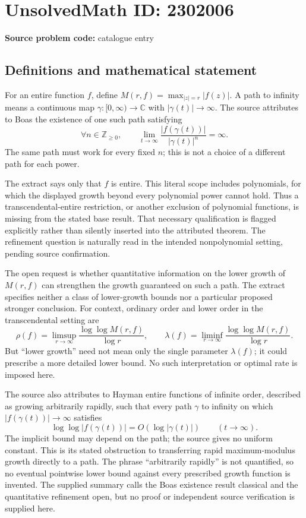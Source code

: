 \documentclass[11pt]{article}
\newcommand{\Z}{\mathbb{Z}}
\newcommand{\C}{\mathbb{C}}
\begin{document}
\section*{UnsolvedMath ID: 2302006}
\textbf{Source problem code:} catalogue entry
\subsection{Definitions and mathematical statement}
For an entire function $f$, define $M(r,f)=\max_{|z|=r}|f(z)|$. A path to infinity means a continuous map $\gamma:[0,\infty)\to\C$ with $|\gamma(t)|\to\infty$. The source attributes to Boas the existence of one such path satisfying
\[
\forall n\in\Z_{\ge0},\qquad
\lim_{t\to\infty}\frac{|f(\gamma(t))|}{|\gamma(t)|^n}=\infty.
\]
The same path must work for every fixed $n$; this is not a choice of a different path for each power.

The extract says only that $f$ is entire. This literal scope includes polynomials, for which the displayed growth beyond every polynomial power cannot hold. Thus a transcendental-entire restriction, or another exclusion of polynomial functions, is missing from the stated base result. That necessary qualification is flagged explicitly rather than silently inserted into the attributed theorem. The refinement question is naturally read in the intended nonpolynomial setting, pending source confirmation.

The open request is whether quantitative information on the lower growth of $M(r,f)$ can strengthen the growth guaranteed on such a path. The extract specifies neither a class of lower-growth bounds nor a particular proposed stronger conclusion. For context, ordinary order and lower order in the transcendental setting are
\[
\rho(f)=\limsup_{r\to\infty}\frac{\log\log M(r,f)}{\log r},\qquad
\lambda(f)=\liminf_{r\to\infty}\frac{\log\log M(r,f)}{\log r}.
\]
But ``lower growth'' need not mean only the single parameter $\lambda(f)$; it could prescribe a more detailed lower bound. No such interpretation or optimal rate is imposed here.

The source also attributes to Hayman entire functions of infinite order, described as growing arbitrarily rapidly, such that every path $\gamma$ to infinity on which $|f(\gamma(t))|\to\infty$ satisfies
\[
\log\log|f(\gamma(t))|=O(\log|\gamma(t)|)\qquad(t\to\infty).
\]
The implicit bound may depend on the path; the source gives no uniform constant. This is its stated obstruction to transferring rapid maximum-modulus growth directly to a path. The phrase ``arbitrarily rapidly'' is not quantified, so no eventual pointwise lower bound against every prescribed growth function is invented. The supplied summary calls the Boas existence result classical and the quantitative refinement open, but no proof or independent source verification is supplied here.
\end{document}
